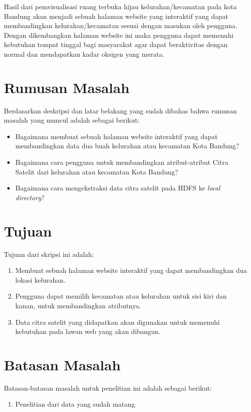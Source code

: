 Hasil dari pemvisualisasi ruang terbuka hijau kelurahan/kecamatan pada kota Bandung akan menjadi sebuah halaman website yang interaktif yang dapat membandingkan kelurahan/kecamatan sesuai dengan masukan oleh pengguna. Dengan dikembangkan halaman website ini maka pengguna dapat memenuhi kebutuhan tempat tinggal bagi masyarakat agar dapat beraktivitas dengan normal dan mendapatkan kadar oksigen yang merata. 

\section{Rumusan Masalah}
\label{sec:rumusan}
Berdasarkan deskripsi dan latar belakang yang sudah dibahas bahwa rumusan masalah yang muncul adalah sebagai berikut:

\begin{itemize}
	\item Bagaimana membuat sebuah halaman website interaktif yang dapat membandingkan data dua buah kelurahan atau kecamatan Kota Bandung?
	\item Bagaimana cara pengguna untuk membandingkan atribut-atribut Citra Satelit dari kelurahan atau kecamatan Kota Bandung?
	\item Bagaimana cara mengekstraksi data citra satelit pada HDFS ke \textit{local directory}?	
\end{itemize}

\section{Tujuan}
\label{sec:tujuan}
Tujuan dari skripsi ini adalah:
\begin{enumerate}
	\item Membuat sebuah halaman website interaktif yang dapat membandingkan dua lokasi kelurahan.
	\item Pengguna dapat memilih kecamatan atau kelurahan untuk sisi kiri dan kanan, untuk membandingkan atributnya.
	\item Data citra satelit yang didapatkan akan digunakan untuk memenuhi kebutuhan pada lawan web yang akan dibangun.
\end{enumerate}


\section{Batasan Masalah}
\label{sec:batasan}

Batasan-batasan masalah untuk penelitian ini adalah sebagai berikut:
\begin{enumerate}
	\item Penelitian dari data yang sudah matang.
\end{enumerate}

